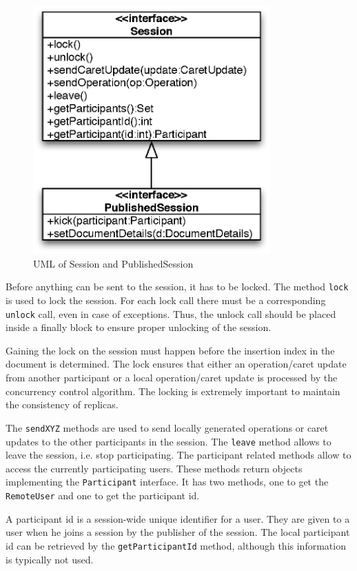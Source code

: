\begin{figure}[H]
 \centering
 \includegraphics[width=9.1cm,height=9.53cm]{../images/design/collaboration-uml-session.eps}
 \caption{UML of Session and PublishedSession}
 \label{fig:session interface}
\end{figure}

Before anything can be sent to the session, it has to be locked. The method
\texttt{lock} is used to lock the session. For each lock call there must
be a corresponding \texttt{unlock} call, even in case of exceptions. Thus,
the unlock call should be placed inside a finally block to ensure proper
unlocking of the session.

Gaining the lock on the session must happen before the insertion index in
the document is determined. The lock ensures that either an operation/caret 
update from another participant or a local operation/caret update is processed
by the concurrency control algorithm. The locking is extremely important
to maintain the consistency of replicas.

The \texttt{sendXYZ} methods are used to send locally generated operations or
caret updates to the other participants in the session. The \texttt{leave}
method allows to leave the session, i.e. stop participating. The participant
related methods allow to access the currently participating users. These
methods return objects implementing the \texttt{Participant} interface. It has
two methods, one to get the \texttt{RemoteUser} and one to get the participant
id.

A participant id is a session-wide unique identifier for a user. They are given
to a user when he joins a session by the publisher of the session. The local
participant id can be retrieved by the \texttt{getParticipantId} method,
although this information is typically not used.

